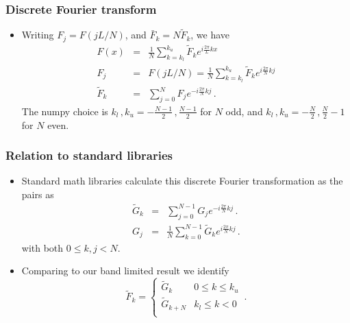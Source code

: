 \documentclass{beamer}
\begin{document}
\begin{frame}
\frametitle{Discrete Fourier transform}
\begin{itemize}
\item
Writing $F_j = F(jL/N)$, and $\bar F_k = N \tilde F_k$, we have
\begin{eqnarray*}
F(x) &=& \frac{1}{N} \sum_{k=k_l}^{k_u} \tilde F_k e^{i \frac{2\pi}{L} k x}
\nonumber\\
F_j &=& F(jL/N)  = \frac{1}{N} \sum_{k=k_l}^{k_u}
\tilde F_k e^{i \frac{2\pi}{N} kj}
\nonumber\\
\tilde F_k &=& \sum_{j=0}^N F_j e^{-i \frac{2\pi}{N} kj} \,.
\end{eqnarray*}
The numpy choice is
$k_l\,,k_u = -\frac{N-1}{2}\,,\frac{N-1}{2}$ for $N$ odd, and
$k_l\,,k_u = -\frac{N}{2}\,,\frac{N}{2}-1$ for $N$ even.
\end{itemize}
\end{frame}

\begin{frame}
\frametitle{Relation to standard libraries}
\begin{itemize}
\item
Standard math libraries calculate this discrete Fourier transformation
as the pairs as
\begin{eqnarray*}
\tilde G_k &=& \sum_{j=0}^{N-1} G_j e^{-i \frac{2\pi}{N} kj} \,.
\nonumber\\
G_j &=& \frac{1}{N} \sum_{k=0}^{N-1} \tilde G_k e^{i \frac{2\pi}{N} kj} \,.
\end{eqnarray*}
with both $0 \le k,j < N$. 
\item
Comparing to our band limited result we identify
\begin{equation}
\tilde F_k = \left \{
\begin{array}{cc}
\tilde G_k & 0 \leq k \leq k_u\\
\tilde G_{k+N} & k_l \leq k < 0\\
\end{array}
\right . \,.
\end{equation}
\end{itemize}
\end{frame}
\end{document}
